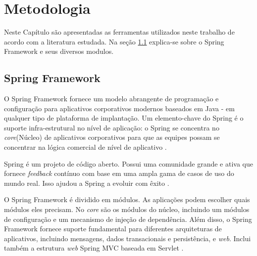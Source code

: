 
\chapter{Metodologia} \label{cap:metodologia}

Neste Capítulo são apresentadas as ferramentas utilizados neste trabalho de acordo com a literatura estudada. Na seção \ref{sec:SpringFramework} explica-se sobre o Spring Framework e seus diversos modulos. 

\section{Spring Framework}\label{sec:SpringFramework}

O Spring Framework fornece um modelo abrangente de programação e configuração para aplicativos corporativos modernos baseados em Java - em qualquer tipo de plataforma de implantação. Um elemento-chave do Spring é o suporte infra-estrutural no nível de aplicação: o Spring se concentra no \textit{core}(Núcleo) de aplicativos corporativos para que as equipes possam se concentrar na lógica comercial de nível de aplicativo \cite{SpringFramework:2017}.

Spring é um projeto de código aberto. Possui uma comunidade grande e ativa que fornece \textit{feedback} contínuo com base em uma ampla gama de casos de uso do mundo real. Isso ajudou a Spring a evoluir com êxito \cite{SpringFramework:2017}.

O Spring Framework é dividido em módulos. As aplicações podem escolher quais módulos eles precisam. No \textit{core} são os módulos do núcleo, incluindo um módulos de configuração e um mecanismo de injeção de dependência. Além disso, o Spring Framework fornece suporte fundamental para diferentes arquiteturas de aplicativos, incluindo mensagens, dados transacionais e persistência, e \textit{web}. Inclui também a estrutura \textit{web} Spring MVC baseada em Servlet \cite{SpringFramework:2017}.

